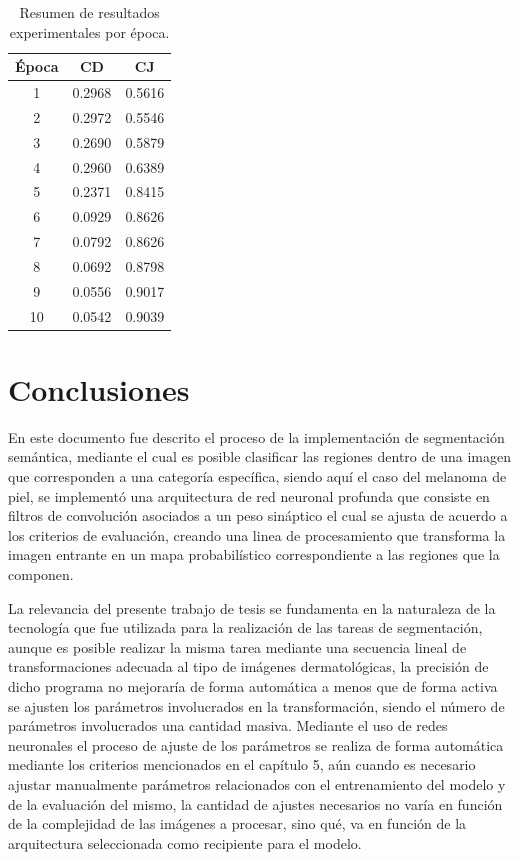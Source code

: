 \begin{table}[h]
    \centering
    \caption{Resumen de resultados experimentales por época.}
    \begin{tabular}{c c c}
      \toprule
      \textbf{Época} & \textbf{CD} & \textbf{CJ} \\
      \midrule
      1 & 0.2968 & 0.5616 \\
      2 & 0.2972 & 0.5546 \\
      3 & 0.2690 & 0.5879 \\
      4 & 0.2960 & 0.6389 \\
      5 & 0.2371 & 0.8415 \\
      6 & 0.0929 & 0.8626 \\
      7 & 0.0792 & 0.8626 \\
      8 & 0.0692 & 0.8798 \\
      9 & 0.0556 & 0.9017 \\
      10 & 0.0542 & 0.9039 \\
      \bottomrule
      
    \end{tabular}
    \label{table:summary}
  \end{table}

\chapter{Conclusiones}

En este documento fue descrito el proceso de la implementación de segmentación semántica, mediante el cual es posible clasificar las regiones dentro de una imagen que corresponden a una categoría específica, siendo aquí el caso del melanoma de piel, se implementó una arquitectura de red neuronal profunda que consiste en filtros de convolución asociados a un peso sináptico el cual se ajusta de acuerdo a los criterios de evaluación, creando una linea de procesamiento que transforma la imagen entrante en un mapa probabilístico correspondiente a las regiones que la componen.

La relevancia del presente trabajo de tesis se fundamenta en la naturaleza de la tecnología que fue utilizada para la realización de las tareas de segmentación, aunque es posible realizar la misma tarea mediante una secuencia lineal de transformaciones adecuada al tipo de imágenes dermatológicas, la precisión de dicho programa no mejoraría de forma automática a menos que de forma activa se ajusten los parámetros involucrados en la transformación, siendo el número de parámetros involucrados una cantidad masiva. Mediante el uso de redes neuronales el proceso de ajuste de los parámetros se realiza de forma automática mediante los criterios mencionados en el capítulo 5, aún cuando es necesario ajustar manualmente parámetros relacionados con el entrenamiento del modelo y de la evaluación del mismo, la cantidad de ajustes necesarios no varía en función de la complejidad de las imágenes a procesar, sino qué, va en función de la arquitectura seleccionada como recipiente para el modelo.

